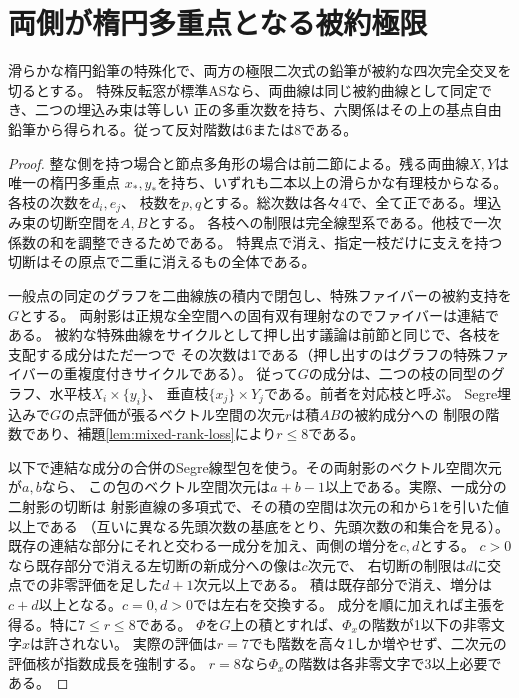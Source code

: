 \section{両側が楕円多重点となる被約極限}
\label{sec:reduced-additive-limits}
\begin{theorem}[被約二側の特殊化]\label{thm:all-reduced-apolar-specializations}
滑らかな楕円鉛筆の特殊化で、両方の極限二次式の鉛筆が被約な四次完全交叉を切るとする。
特殊反転窓が標準ASなら、両曲線は同じ被約曲線として同定でき、二つの埋込み束は等しい
正の多重次数を持ち、六関係はその上の基点自由鉛筆から得られる。従って反対階数は6または8である。
\end{theorem}
\begin{proof}
整な側を持つ場合と節点多角形の場合は前二節による。残る両曲線$X,Y$は唯一の楕円多重点
$x_*,y_*$を持ち、いずれも二本以上の滑らかな有理枝からなる。各枝の次数を$d_i,e_j$、
枝数を$p,q$とする。総次数は各々4で、全て正である。埋込み束の切断空間を$A,B$とする。
各枝への制限は完全線型系である。他枝で一次係数の和を調整できるためである。
特異点で消え、指定一枝だけに支えを持つ切断はその原点で二重に消えるもの全体である。

一般点の同定のグラフを二曲線族の積内で閉包し、特殊ファイバーの被約支持を$G$とする。
両射影は正規な全空間への固有双有理射なのでファイバーは連結である。
被約な特殊曲線をサイクルとして押し出す議論は前節と同じで、各枝を支配する成分はただ一つで
その次数は1である（押し出すのはグラフの特殊ファイバーの重複度付きサイクルである）。
従って$G$の成分は、二つの枝の同型のグラフ、水平枝$X_i\times\{y_i\}$、
垂直枝$\{x_j\}\times Y_j$である。前者を対応枝と呼ぶ。
Segre埋込みで$G$の点評価が張るベクトル空間の次元$r$は積$AB$の被約成分への
制限の階数であり、補題\ref{lem:mixed-rank-loss}により$r\le8$である。

以下で連結な成分の合併のSegre線型包を使う。その両射影のベクトル空間次元が$a,b$なら、
この包のベクトル空間次元は$a+b-1$以上である。実際、一成分の二射影の切断は
射影直線の多項式で、その積の空間は次元の和から1を引いた値以上である
（互いに異なる先頭次数の基底をとり、先頭次数の和集合を見る）。
既存の連結な部分にそれと交わる一成分を加え、両側の増分を$c,d$とする。
$c>0$なら既存部分で消える左切断の新成分への像は$c$次元で、
右切断の制限は$d$に交点での非零評価を足した$d+1$次元以上である。
積は既存部分で消え、増分は$c+d$以上となる。$c=0,d>0$では左右を交換する。
成分を順に加えれば主張を得る。特に$7\le r\le8$である。
$\Phi$を$G$上の積とすれば、$\Phi_x$の階数が1以下の非零文字$x$は許されない。
実際の評価は$r=7$でも階数を高々1しか増やせず、二次元の評価核が指数成長を強制する。
$r=8$なら$\Phi_x$の階数は各非零文字で3以上必要である。


\end{proof}
